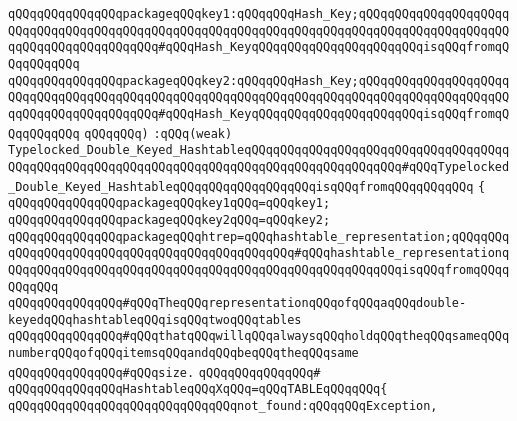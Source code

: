 \verb|qQQqqQQqqQQqqQQqpackageqQQqkey1:qQQqqQQqHash_Key;qQQqqQQqqQQqqQQqqQQqqQQqqQQqqQQqqQQqqQQqqQQqqQQqqQQqqQQqqQQqqQQqqQQqqQQqqQQqqQQqqQQqqQQqqQQqqQQqqQQqqQQqqQQqqQQq#qQQqHash_KeyqQQqqQQqqQQqqQQqqQQqqQQqisqQQqfromqQQqqQQqqQQq|\newline
\verb|qQQqqQQqqQQqqQQqpackageqQQqkey2:qQQqqQQqHash_Key;qQQqqQQqqQQqqQQqqQQqqQQqqQQqqQQqqQQqqQQqqQQqqQQqqQQqqQQqqQQqqQQqqQQqqQQqqQQqqQQqqQQqqQQqqQQqqQQqqQQqqQQqqQQqqQQq#qQQqHash_KeyqQQqqQQqqQQqqQQqqQQqqQQqisqQQqfromqQQqqQQqqQQq|\newline
\verb|qQQqqQQq)|\newline
\verb|:qQQq(weak)|\newline
\verb|Typelocked_Double_Keyed_HashtableqQQqqQQqqQQqqQQqqQQqqQQqqQQqqQQqqQQqqQQqqQQqqQQqqQQqqQQqqQQqqQQqqQQqqQQqqQQqqQQqqQQqqQQqqQQq#qQQqTypelocked_Double_Keyed_HashtableqQQqqQQqqQQqqQQqqQQqisqQQqfromqQQqqQQqqQQq|\newline
\verb|{|\newline
\verb|qQQqqQQqqQQqqQQqpackageqQQqkey1qQQq=qQQqkey1;|\newline
\verb|qQQqqQQqqQQqqQQqpackageqQQqkey2qQQq=qQQqkey2;|\newline
\newline
\verb|qQQqqQQqqQQqqQQqpackageqQQqhtrep=qQQqhashtable_representation;qQQqqQQqqQQqqQQqqQQqqQQqqQQqqQQqqQQqqQQqqQQqqQQq#qQQqhashtable_representationqQQqqQQqqQQqqQQqqQQqqQQqqQQqqQQqqQQqqQQqqQQqqQQqqQQqqQQqisqQQqfromqQQqqQQqqQQq|\newline
\newline
\verb|qQQqqQQqqQQqqQQq#qQQqTheqQQqrepresentationqQQqofqQQqaqQQqdouble-keyedqQQqhashtableqQQqisqQQqtwoqQQqtables|\newline
\verb|qQQqqQQqqQQqqQQq#qQQqthatqQQqwillqQQqalwaysqQQqholdqQQqtheqQQqsameqQQqnumberqQQqofqQQqitemsqQQqandqQQqbeqQQqtheqQQqsame|\newline
\verb|qQQqqQQqqQQqqQQq#qQQqsize.|\newline
\verb|qQQqqQQqqQQqqQQq#|\newline
\verb|qQQqqQQqqQQqqQQqHashtableqQQqXqQQq=qQQqTABLEqQQqqQQq{|\newline
\verb|qQQqqQQqqQQqqQQqqQQqqQQqqQQqqQQqnot_found:qQQqqQQqException,|\newline
